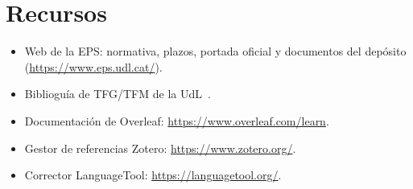 \documentclass[11pt,a4paper]{article}
\begin{document}
\section*{Recursos}

\begin{itemize}
  \item Web de la EPS: normativa, plazos, portada oficial y documentos del
        depósito (\url{https://www.eps.udl.cat/}).
  \item Biblioguía de TFG/TFM de la UdL~\cite{udl_biblioguia}.
  \item Documentación de Overleaf: \url{https://www.overleaf.com/learn}.
  \item Gestor de referencias Zotero: \url{https://www.zotero.org/}.
  \item Corrector LanguageTool: \url{https://languagetool.org/}.
\end{itemize}

\printbibliography[heading=bibintoc,title={Referencias}]
\end{document}

